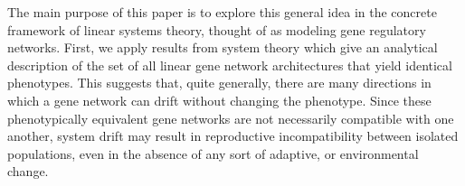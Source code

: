 \documentclass{article}
\newcommand{\jss}[1]{{\color{olive}\it #1}}
\newcommand{\1}{\mathbbm{1}}
\begin{document}
The main purpose of this paper is to explore this general idea
in the concrete framework of linear systems theory,
thought of as modeling gene regulatory networks.
First, we apply results from system theory which give
an analytical description of the set of 
all linear gene network architectures that yield identical phenotypes.
This suggests that, quite generally, there are many directions in which a gene network can drift
without changing the phenotype.
Since these phenotypically equivalent gene networks are not necessarily compatible with one another, 
system drift may result in reproductive incompatibility between isolated populations,
even in the absence of any sort of adaptive, or environmental change. 

%
\end{document}
